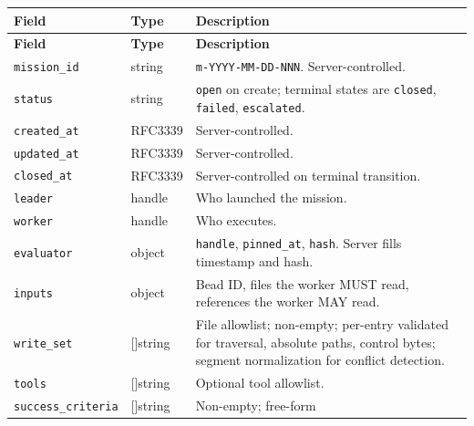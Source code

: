 \documentclass[a4paper,10pt]{article}
\newcommand{\field}[1]{\texttt{#1}}
\begin{document}
\begin{center}
\begin{longtable}{@{}llp{7cm}@{}}
\toprule
\textbf{Field} & \textbf{Type} & \textbf{Description} \\
\midrule
\endfirsthead
\toprule
\textbf{Field} & \textbf{Type} & \textbf{Description} \\
\midrule
\endhead
\field{mission\_id}    & string         & \verb|m-YYYY-MM-DD-NNN|.
                                          Server-controlled. \\
\field{status}         & string         & \texttt{open} on create;
                                          terminal states are
                                          \texttt{closed},
                                          \texttt{failed},
                                          \texttt{escalated}. \\
\field{created\_at}    & RFC3339        & Server-controlled. \\
\field{updated\_at}    & RFC3339        & Server-controlled. \\
\field{closed\_at}     & RFC3339        & Server-controlled on
                                          terminal transition. \\
\field{leader}         & handle         & Who launched the mission. \\
\field{worker}         & handle         & Who executes. \\
\field{evaluator}      & object         & \field{handle},
                                          \field{pinned\_at},
                                          \field{hash}.  Server
                                          fills timestamp and hash. \\
\field{inputs}         & object         & Bead ID, files the worker
                                          MUST read, references the
                                          worker MAY read. \\
\field{write\_set}     & []string       & File allowlist; non-empty;
                                          per-entry validated for
                                          traversal, absolute paths,
                                          control bytes; segment
                                          normalization for conflict
                                          detection. \\
\field{tools}          & []string       & Optional tool allowlist. \\
\field{success\_criteria} & []string    & Non-empty; free-form

\end{longtable}
\end{center}
\end{document}
